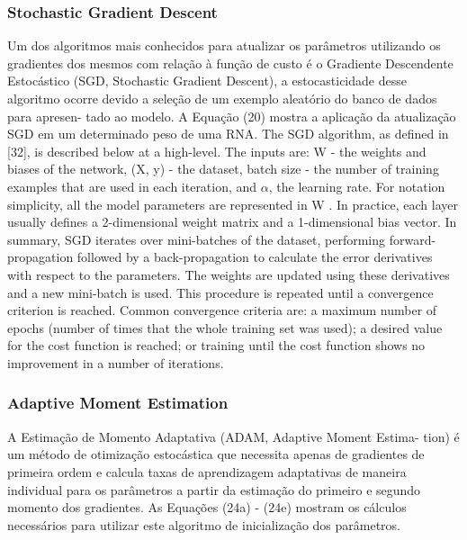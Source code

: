 \subsubsection{Stochastic Gradient Descent}
Um dos algoritmos mais conhecidos para atualizar os parâmetros utilizando
os gradientes dos mesmos com relação à função de custo é o Gradiente Descendente
Estocástico (SGD, Stochastic Gradient Descent), a estocasticidade desse algoritmo
ocorre devido a seleção de um exemplo aleatório do banco de dados para apresen-
tado ao modelo. A Equação (20) mostra a aplicação da atualização SGD em um
determinado peso de uma RNA.
The SGD algorithm, as defined in [32], is described below at a high-level. The inputs
are: W - the weights and biases of the network, (X, y) - the dataset, batch size - the
number of training examples that are used in each iteration, and $\alpha$, the learning rate.
For notation simplicity, all the model parameters are represented in W . In practice, each
layer usually defines a 2-dimensional weight matrix and a 1-dimensional bias vector. In
summary, SGD iterates over mini-batches of the dataset, performing forward-propagation
followed by a back-propagation to calculate the error derivatives with respect to the
parameters. The weights are updated using these derivatives and a new mini-batch is
used. This procedure is repeated until a convergence criterion is reached. Common
convergence criteria are: a maximum number of epochs (number of times that the whole
training set was used); a desired value for the cost function is reached; or training until
the cost function shows no improvement in a number of iterations.
\subsubsection{Adaptive Moment Estimation}
A Estimação de Momento Adaptativa (ADAM, Adaptive Moment Estima-
tion) é um método de otimização estocástica que necessita apenas de gradientes de
primeira ordem e calcula taxas de aprendizagem adaptativas de maneira individual
para os parâmetros a partir da estimação do primeiro e segundo momento dos
gradientes. As Equações (24a) - (24e) mostram os cálculos necessários para utilizar
este algoritmo de inicialização dos parâmetros.
